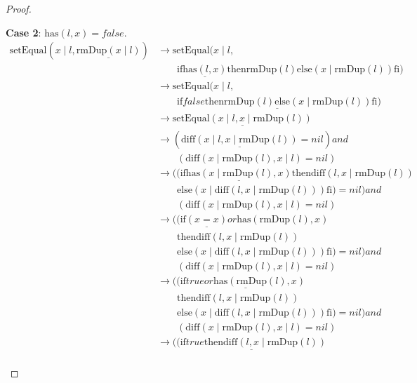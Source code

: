 \documentclass[12pt, a4paper]{article}
\newcommand{\rel}[1]{\mathrel{#1}}
\newcommand{\rmx}[1]{\mathrm{#1}}
\newcommand{\larrow}{\longrightarrow}
\newcommand{\under}{\underline}
\begin{document}
\begin{proof}
\begin{description}
\textbf{Case 2}: $\rmx{has}(l, x) = false$.
\begin{align*}
\rmx{setEqual}(x \mid l, \under{\rmx{rmDup}(x \mid l)})
	&\larrow \rmx{setEqual}(x \mid l, \\
	&\quad \quad \rel{\rmx{if}} \under{\rmx{has}(l, x)} \rel{\rmx{then}} \rmx{rmDup}(l) \rel{\rmx{else}} (x \mid \rmx{rmDup}(l)) \rel{\rmx{fi}}) \tag{by rmDup2} \\
	&\larrow \rmx{setEqual}(x \mid l, \\
	&\quad \quad \under{\rel{\rmx{if}} false \rel{\rmx{then}} \rmx{rmDup}(l) \rel{\rmx{else}} (x \mid \rmx{rmDup}(l)) \rel{\rmx{fi}}}) \tag{by case splitting} \\
	&\larrow \under{\rmx{setEqual}(x \mid l, x \mid \rmx{rmDup}(l))} \tag{by if2} \\
	&\larrow (\under{\rmx{diff}(x \mid l, x \mid \rmx{rmDup}(l))} = nil) \rel{and} \\
	&\quad \quad (\rmx{diff}(x \mid \rmx{rmDup}(l), x \mid l) = nil) \tag{by setEq} \\
	&\larrow ((\rel{\rmx{if}} \under{\rmx{has}(x \mid \rmx{rmDup}(l), x)} \rel{\rmx{then}} \rmx{diff}(l, x \mid \rmx{rmDup}(l)) \\
	&\quad \quad \rel{\rmx{else}} (x \mid \rmx{diff}(l, x \mid \rmx{rmDup}(l))) \rel{\rmx{fi}}) = nil) \rel{and} \\
	&\quad \quad (\rmx{diff}(x \mid \rmx{rmDup}(l), x \mid l) = nil) \tag{by diff2} \\
	&\larrow ((\rel{\rmx{if}} \under{(x = x)} \rel{or} \rmx{has}(\rmx{rmDup}(l), x) \\
	&\quad \quad \rel{\rmx{then}} \rmx{diff}(l, x \mid \rmx{rmDup}(l)) \\
	&\quad \quad \rel{\rmx{else}} (x \mid \rmx{diff}(l, x \mid \rmx{rmDup}(l))) \rel{\rmx{fi}}) = nil) \rel{and} \\
	&\quad \quad (\rmx{diff}(x \mid \rmx{rmDup}(l), x \mid l) = nil) \tag{by has2} \\
	&\larrow ((\rel{\rmx{if}} \under{true \rel{or} \rmx{has}(\rmx{rmDup}(l), x)} \\
	&\quad \quad \rel{\rmx{then}} \rmx{diff}(l, x \mid \rmx{rmDup}(l)) \\
	&\quad \quad \rel{\rmx{else}} (x \mid \rmx{diff}(l, x \mid \rmx{rmDup}(l))) \rel{\rmx{fi}}) = nil) \rel{and} \\
	&\quad \quad (\rmx{diff}(x \mid \rmx{rmDup}(l), x \mid l) = nil) \tag{by equality} \\
	&\larrow (\under{(\rel{\rmx{if}} true \rel{\rmx{then}} \rmx{diff}(l, x \mid \rmx{rmDup}(l))} \\

\end{align*}
\end{description}
\end{proof}
\end{document}
